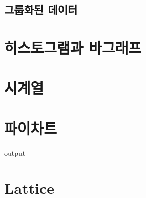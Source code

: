 \subsection{그룹화된 데이터}


\section{히스토그램과 바그래프}


\section{시계열}


\section{파이차트}




\begin{Schunk}
\begin{Soutput}
output
\end{Soutput}
\end{Schunk}


\section{Lattice}

